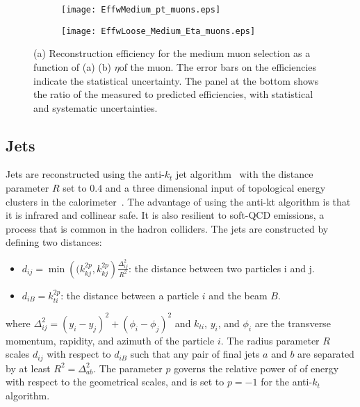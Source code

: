 \begin{figure}[t!]
\centering
\begin{subfigure}[t]{0.54\textwidth}
\texttt{[image: EffwMedium\_pt\_muons.eps]}
\subcaption{}
\label{fig:}
\end{subfigure}
\begin{subfigure}[t]{0.4\textwidth}
\texttt{[image: EffwLoose\_Medium\_Eta\_muons.eps]}
\subcaption{}
\label{fig:}
\end{subfigure}
\vspace{-0.25cm}
\caption{(a) Reconstruction efficiency for the medium muon selection as a function of (a) \pt (b) $\eta $of the muon.
 The error bars on the efficiencies indicate the statistical uncertainty. The panel at the bottom shows the ratio of the measured to predicted efficiencies, with statistical and systematic uncertainties.
}
\label{fig:exp.reco.muon}
\end{figure} 


\subsection{Jets}
Jets are reconstructed using the anti-$k_{t}$ jet algorithm~\cite{Cacciari:2008gp} 
with the distance parameter $R$ set to $0.4$ and 
a three dimensional input of topological energy clusters in the 
calorimeter~\cite{PERF-2014-07}. 
The advantage of using the anti-kt algorithm is that it is infrared and collinear safe.
It is also resilient to soft-QCD emissions, a process that is common in the hadron colliders.
The jets are constructed by defining two distances:
\begin{itemize}
\item $d_{ij} = \min\left((k_{kj}^{2p},k_{kj}^{2p}\right)\frac{\Delta_{ij}^2}{R^2}$: the distance between two particles i and j.
\item $d_{iB} = k_{ti}^{2p}$: the distance between a particle $i$ and the beam $B$.
\end{itemize}
where $\Delta_{ij}^2 = \left( y_i - y_j\right)^2 + \left(\phi_i - \phi_j\right)^2$ and $k_{ti}$, $y_i$, and $\phi_i$ are the transverse momentum, rapidity, and azimuth of the 
particle $i$. The radius parameter $R$ scales $d_{ij}$ with respect to $d_{iB}$ such that any pair of final jets $a$ and $b$ are separated by at least $R^2=\Delta_{ab}^2$.
The parameter $p$ governs the relative power of of energy with respect to the geometrical scales, and is set to $p=-1$ for the anti-$k_{t}$ algorithm.


